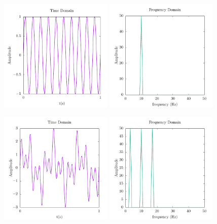 \begin{figure}

\begin{centering}

\includegraphics[width = 0.48\textwidth]{data/splitop/fourier/sine_wave.pdf}
\includegraphics[width = 0.48\textwidth]{data/splitop/fourier/sine_fft.pdf}

\includegraphics[width = 0.48\textwidth]{data/splitop/fourier/3_waves.pdf}
\includegraphics[width = 0.48\textwidth]{data/splitop/fourier/3_fft.pdf}


\end{centering}
\end{figure}
